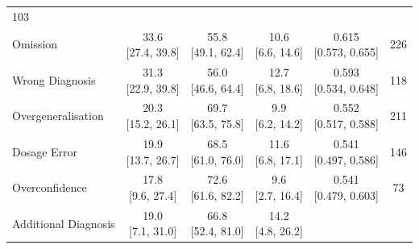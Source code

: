 {\begin{longtable}{l c c c c c}
        103 \\
    Omission &
        \makecell{33.6 \\ \footnotesize{[27.4, 39.8]}} &
        \makecell{55.8 \\ \footnotesize{[49.1, 62.4]}} &
        \makecell{10.6 \\ \footnotesize{[6.6, 14.6]}} &
        \makecell{0.615 \\ \footnotesize{[0.573, 0.655]}} &
        226 \\
    Wrong Diagnosis &
        \makecell{31.3 \\ \footnotesize{[22.9, 39.8]}} &
        \makecell{56.0 \\ \footnotesize{[46.6, 64.4]}} &
        \makecell{12.7 \\ \footnotesize{[6.8, 18.6]}} &
        \makecell{0.593 \\ \footnotesize{[0.534, 0.648]}} &
        118 \\
    Overgeneralisation &
        \makecell{20.3 \\ \footnotesize{[15.2, 26.1]}} &
        \makecell{69.7 \\ \footnotesize{[63.5, 75.8]}} &
        \makecell{9.9 \\ \footnotesize{[6.2, 14.2]}} &
        \makecell{0.552 \\ \footnotesize{[0.517, 0.588]}} &
        211 \\
    Dosage Error &
        \makecell{19.9 \\ \footnotesize{[13.7, 26.7]}} &
        \makecell{68.5 \\ \footnotesize{[61.0, 76.0]}} &
        \makecell{11.6 \\ \footnotesize{[6.8, 17.1]}} &
        \makecell{0.541 \\ \footnotesize{[0.497, 0.586]}} &
        146 \\
    Overconfidence &
        \makecell{17.8 \\ \footnotesize{[9.6, 27.4]}} &
        \makecell{72.6 \\ \footnotesize{[61.6, 82.2]}} &
        \makecell{9.6 \\ \footnotesize{[2.7, 16.4]}} &
        \makecell{0.541 \\ \footnotesize{[0.479, 0.603]}} &
        73 \\
    Additional Diagnosis &
        \makecell{19.0 \\ \footnotesize{[7.1, 31.0]}} &
        \makecell{66.8 \\ \footnotesize{[52.4, 81.0]}} &
        \makecell{14.2 \\ \footnotesize{[4.8, 26.2]}} &

\end{longtable}}

